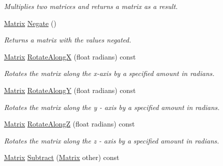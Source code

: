 \begin{DoxyCompactItemize}
\begin{DoxyCompactList}\small\item\em Multiplies two matrices and returns a matrix as a result. \end{DoxyCompactList}\item 
\hypertarget{struct_jade_1_1_math_1_1_matrix_a93092c82d04a623e9da883b5288b20b1}{}\hyperlink{struct_jade_1_1_math_1_1_matrix}{Matrix} \hyperlink{struct_jade_1_1_math_1_1_matrix_a93092c82d04a623e9da883b5288b20b1}{Negate} ()\label{struct_jade_1_1_math_1_1_matrix_a93092c82d04a623e9da883b5288b20b1}

\begin{DoxyCompactList}\small\item\em Returns a matrix with the values negated. \end{DoxyCompactList}\item 
\hypertarget{struct_jade_1_1_math_1_1_matrix_a930c8e6f7409fbab5f4d30946fc411a5}{}\hyperlink{struct_jade_1_1_math_1_1_matrix}{Matrix} \hyperlink{struct_jade_1_1_math_1_1_matrix_a930c8e6f7409fbab5f4d30946fc411a5}{Rotate\+Along\+X} (float radians) const \label{struct_jade_1_1_math_1_1_matrix_a930c8e6f7409fbab5f4d30946fc411a5}

\begin{DoxyCompactList}\small\item\em Rotates the matrix along the x-\/axis by a specified amount in radians. \end{DoxyCompactList}\item 
\hypertarget{struct_jade_1_1_math_1_1_matrix_a874b086183562b6d3c206d3aa89357a2}{}\hyperlink{struct_jade_1_1_math_1_1_matrix}{Matrix} \hyperlink{struct_jade_1_1_math_1_1_matrix_a874b086183562b6d3c206d3aa89357a2}{Rotate\+Along\+Y} (float radians) const \label{struct_jade_1_1_math_1_1_matrix_a874b086183562b6d3c206d3aa89357a2}

\begin{DoxyCompactList}\small\item\em Rotates the matrix along the y -\/ axis by a specified amount in radians. \end{DoxyCompactList}\item 
\hypertarget{struct_jade_1_1_math_1_1_matrix_a4e611999b9d39fb3027f2c9007a1f930}{}\hyperlink{struct_jade_1_1_math_1_1_matrix}{Matrix} \hyperlink{struct_jade_1_1_math_1_1_matrix_a4e611999b9d39fb3027f2c9007a1f930}{Rotate\+Along\+Z} (float radians) const \label{struct_jade_1_1_math_1_1_matrix_a4e611999b9d39fb3027f2c9007a1f930}

\begin{DoxyCompactList}\small\item\em Rotates the matrix along the z -\/ axis by a specified amount in radians. \end{DoxyCompactList}\item 
\hypertarget{struct_jade_1_1_math_1_1_matrix_af5c307e7450771500c0b1199f7f04096}{}\hyperlink{struct_jade_1_1_math_1_1_matrix}{Matrix} \hyperlink{struct_jade_1_1_math_1_1_matrix_af5c307e7450771500c0b1199f7f04096}{Subtract} (\hyperlink{struct_jade_1_1_math_1_1_matrix}{Matrix} other) const \label{struct_jade_1_1_math_1_1_matrix_af5c307e7450771500c0b1199f7f04096}


\end{DoxyCompactItemize}

